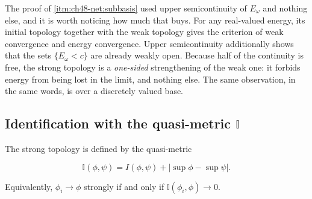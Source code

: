 \begin{remark}
\label{rem:ch48-usc-is-the-point}
The proof of \cref{itm:ch48-net:subbasis} used upper semicontinuity of
$E_\omega$ and nothing else, and it is worth noticing how much that
buys.  For any real-valued energy, its initial topology together with the weak
topology gives the criterion of weak convergence and energy convergence.
Upper semicontinuity additionally shows that the sets $\{E_\omega<c\}$
are already weakly open. Because half of the continuity is free,
the strong topology is a \emph{one-sided} strengthening of the weak one:
it forbids energy from being lost in the limit, and nothing else.  The
same observation, in the same words, is
 over a discretely valued base.
\end{remark}

\subsection{Identification with the quasi-metric \texorpdfstring{$\mathbb I$}{I}}
\label{sec:ch48-quasimetric-identification}

\begin{theorem}\label{thm:bj-strong-e1-quasimetric}
The strong topology is defined by the quasi-metric

\[
 \mathbb I(\phi,\psi)
   =I(\phi,\psi)+|\sup\phi-\sup\psi|.
\tag{48.2}\label{eq:bj-strong-e1-I}
\]

Equivalently, $\phi_i\to\phi$ strongly if and only if
$\mathbb I(\phi_i,\phi)\to0$.
\end{theorem}

